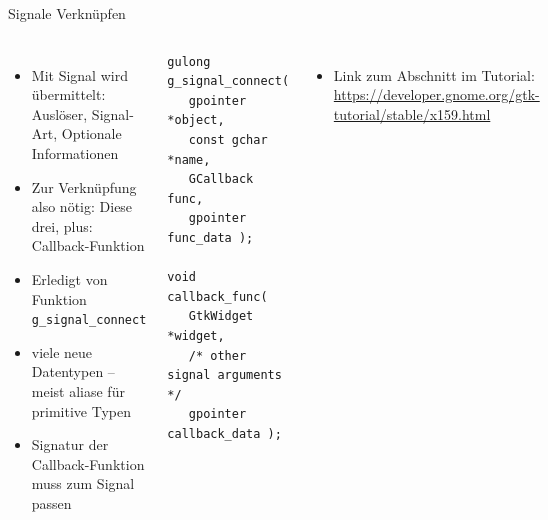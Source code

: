 \begin{frame}[fragile]{Signale Verknüpfen}
%
\begin{columns}[T]
\begin{itemize}
\item Mit Signal wird übermittelt: Auslöser, Signal-Art, Optionale Informationen
\item Zur Verknüpfung also nötig: Diese drei, plus: Callback-Funktion
\item Erledigt von Funktion \texttt{g\_signal\_connect}
\item viele neue Datentypen -- meist aliase für primitive Typen
\item Signatur der Callback-Funktion muss zum Signal passen
\end{itemize}
%
\begin{codebox}
\begin{verbatim}
gulong g_signal_connect(
   gpointer      *object,
   const gchar   *name,
   GCallback     func,
   gpointer      func_data );

void callback_func( 
   GtkWidget *widget,
   /* other signal arguments */
   gpointer   callback_data );
\end{verbatim}
\end{codebox}
%
\begin{itemize}
\item Link zum Abschnitt im Tutorial: \\
	\footnotesize\url{https://developer.gnome.org/gtk-tutorial/stable/x159.html}
\end{itemize}
\end{columns}
%
\end{frame}


